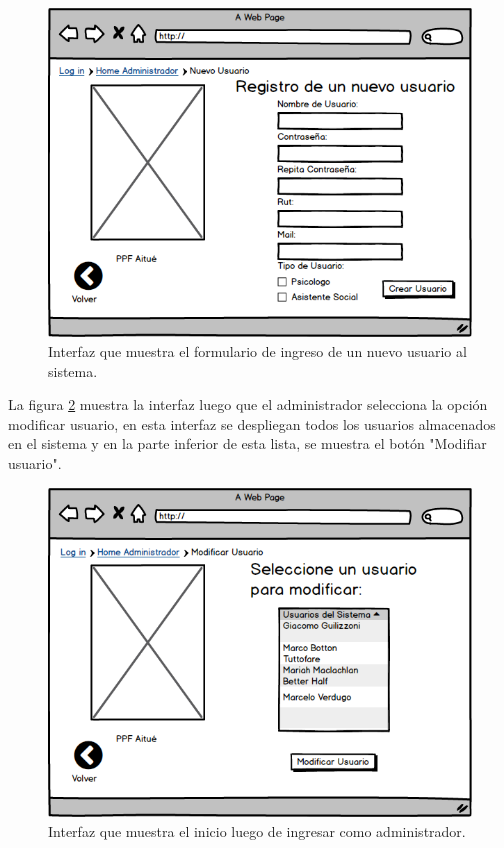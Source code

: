 \begin{figure}[htb]
	\label{newuser}
	\begin{center}
		\includegraphics[scale=0.5]{imagenes/newuser.png}
	\end{center}
	\caption{Interfaz que muestra el formulario de ingreso de un nuevo usuario al sistema.}
\end{figure}

\clearpage
\newpage

La figura \ref{moduser1} muestra la interfaz luego que el administrador selecciona la opción modificar usuario, en esta interfaz se despliegan todos los usuarios almacenados en el sistema y en la parte inferior de esta lista, se muestra el botón "Modifiar usuario". \\


\begin{figure}[htb]
	\label{moduser1}
	\begin{center}
		\includegraphics[scale=0.5]{imagenes/moduser1.png}
	\end{center}
	\caption{Interfaz que muestra el inicio luego de ingresar como administrador.}
\end{figure}

